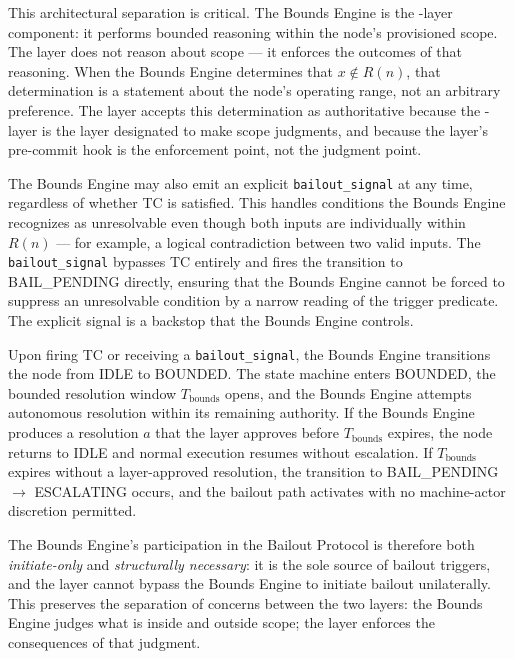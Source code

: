 This architectural separation is critical. The Bounds Engine is the \bounds-layer{} component: it performs bounded reasoning within the node's provisioned scope. The \fact{} layer does not reason about scope --- it enforces the outcomes of that reasoning. When the Bounds Engine determines that $x \notin R(n)$, that determination is a statement about the node's operating range, not an arbitrary preference. The \fact{} layer accepts this determination as authoritative because the \bounds-layer{} is the layer designated to make scope judgments, and because the \fact{} layer's pre-commit hook is the enforcement point, not the judgment point.

The Bounds Engine may also emit an explicit \texttt{bailout\_signal} at any time, regardless of whether TC is satisfied. This handles conditions the Bounds Engine recognizes as unresolvable even though both inputs are individually within $R(n)$ --- for example, a logical contradiction between two valid inputs. The \texttt{bailout\_signal} bypasses TC entirely and fires the transition to BAIL\_PENDING directly, ensuring that the Bounds Engine cannot be forced to suppress an unresolvable condition by a narrow reading of the trigger predicate. The explicit signal is a backstop that the Bounds Engine controls.

Upon firing TC or receiving a \texttt{bailout\_signal}, the Bounds Engine transitions the node from IDLE to BOUNDED. The state machine enters BOUNDED, the bounded resolution window $T_{\text{bounds}}$ opens, and the Bounds Engine attempts autonomous resolution within its remaining authority. If the Bounds Engine produces a resolution $a$ that the \fact{} layer approves before $T_{\text{bounds}}$ expires, the node returns to IDLE and normal execution resumes without escalation. If $T_{\text{bounds}}$ expires without a \fact{} layer-approved resolution, the transition to BAIL\_PENDING $\rightarrow$ ESCALATING occurs, and the bailout path activates with no machine-actor discretion permitted.

The Bounds Engine's participation in the Bailout Protocol is therefore both \emph{initiate-only} and \emph{structurally necessary}: it is the sole source of bailout triggers, and the \fact{} layer cannot bypass the Bounds Engine to initiate bailout unilaterally. This preserves the separation of concerns between the two layers: the Bounds Engine judges what is inside and outside scope; the \fact{} layer enforces the consequences of that judgment.

